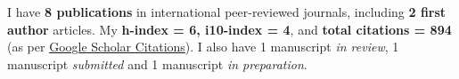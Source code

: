 
I have \textbf{8 publications} in international peer-reviewed journals, including \textbf{2 first author} articles. My \textbf{h-index = 6, i10-index = 4}, and \textbf{total citations = 894} (as per \href{https://scholar.google.com/citations?hl=en&user=6-7FYjIAAAAJ&authuser=2}{Google Scholar Citations}). I also have 1 manuscript \emph{in review}, 1 manuscript \emph{submitted} and 1 manuscript \emph{in preparation}.

\nocite{*}


\printbibliography[heading={none},title={Journal Articles},type=article]



